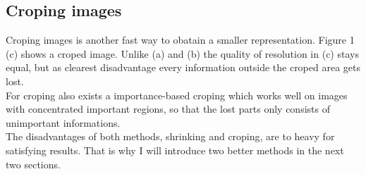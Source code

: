 \subsection{Croping images}
Croping images is another fast way to obatain a smaller representation. Figure 1 (c) shows a croped image. Unlike (a) and (b) the quality of resolution in (c) stays equal, but as clearest disadvantage every information outside the croped area gets lost. \\
For croping also exists a importance-based croping which works well on images with concentrated important regions, so that the lost parts only consists of unimportant informations.\\
The disadvantages of both methods, shrinking and croping, are to heavy for satisfying results. That is why I will introduce two better methods in the next two sections.
